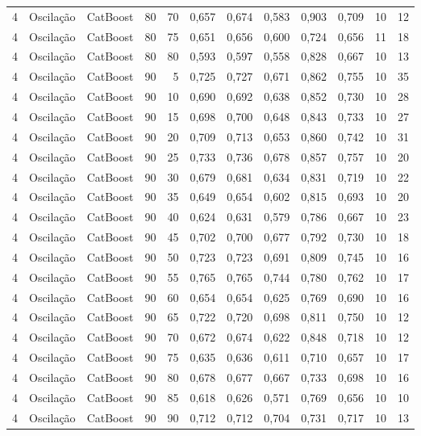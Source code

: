 \begin{longtable}{@{}rllrrrrrrrrr@{}}
4 & Oscilação & CatBoost & 80 & 70 & 0,657 & 0,674 & 0,583 & 0,903 & 0,709 & 10 & 12 \\
4 & Oscilação & CatBoost & 80 & 75 & 0,651 & 0,656 & 0,600 & 0,724 & 0,656 & 11 & 18 \\
4 & Oscilação & CatBoost & 80 & 80 & 0,593 & 0,597 & 0,558 & 0,828 & 0,667 & 10 & 13 \\
4 & Oscilação & CatBoost & 90 & 5 & 0,725 & 0,727 & 0,671 & 0,862 & 0,755 & 10 & 35 \\
4 & Oscilação & CatBoost & 90 & 10 & 0,690 & 0,692 & 0,638 & 0,852 & 0,730 & 10 & 28 \\
4 & Oscilação & CatBoost & 90 & 15 & 0,698 & 0,700 & 0,648 & 0,843 & 0,733 & 10 & 27 \\
4 & Oscilação & CatBoost & 90 & 20 & 0,709 & 0,713 & 0,653 & 0,860 & 0,742 & 10 & 31 \\
4 & Oscilação & CatBoost & 90 & 25 & 0,733 & 0,736 & 0,678 & 0,857 & 0,757 & 10 & 20 \\
4 & Oscilação & CatBoost & 90 & 30 & 0,679 & 0,681 & 0,634 & 0,831 & 0,719 & 10 & 22 \\
4 & Oscilação & CatBoost & 90 & 35 & 0,649 & 0,654 & 0,602 & 0,815 & 0,693 & 10 & 20 \\
4 & Oscilação & CatBoost & 90 & 40 & 0,624 & 0,631 & 0,579 & 0,786 & 0,667 & 10 & 23 \\
4 & Oscilação & CatBoost & 90 & 45 & 0,702 & 0,700 & 0,677 & 0,792 & 0,730 & 10 & 18 \\
4 & Oscilação & CatBoost & 90 & 50 & 0,723 & 0,723 & 0,691 & 0,809 & 0,745 & 10 & 16 \\
4 & Oscilação & CatBoost & 90 & 55 & 0,765 & 0,765 & 0,744 & 0,780 & 0,762 & 10 & 17 \\
4 & Oscilação & CatBoost & 90 & 60 & 0,654 & 0,654 & 0,625 & 0,769 & 0,690 & 10 & 16 \\
4 & Oscilação & CatBoost & 90 & 65 & 0,722 & 0,720 & 0,698 & 0,811 & 0,750 & 10 & 12 \\
4 & Oscilação & CatBoost & 90 & 70 & 0,672 & 0,674 & 0,622 & 0,848 & 0,718 & 10 & 12 \\
4 & Oscilação & CatBoost & 90 & 75 & 0,635 & 0,636 & 0,611 & 0,710 & 0,657 & 10 & 17 \\
4 & Oscilação & CatBoost & 90 & 80 & 0,678 & 0,677 & 0,667 & 0,733 & 0,698 & 10 & 16 \\
4 & Oscilação & CatBoost & 90 & 85 & 0,618 & 0,626 & 0,571 & 0,769 & 0,656 & 10 & 10 \\
4 & Oscilação & CatBoost & 90 & 90 & 0,712 & 0,712 & 0,704 & 0,731 & 0,717 & 10 & 13 \\

\end{longtable}
